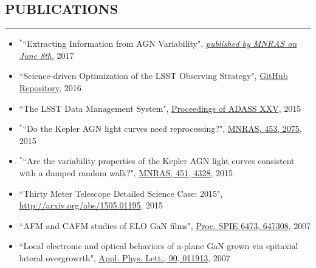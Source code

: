 \documentclass[10pt,a4]{article}
\newcounter{mySaveCounter}
\newcommand\myEnumReset{\setcounter{mySaveCounter}{0}}
\begin{document}
\subsection*{PUBLICATIONS}
\hrule  height 4pt
\vspace{0.2cm}
\begin{itemize}
	\item $\mathbf{^{*}}$``Extracting Information from AGN Variability", \href{https://doi.org/10.1093/mnras/stx1420}{\textit{published by MNRAS on June 8th}}, 2017
    \item ``Science-driven Optimization of the LSST Observing Strategy", \href{https://github.com/LSSTScienceCollaborations/ObservingStrategy}{GitHub Repository}, 2016
	\item ``The LSST Data Management System", \href{http://adsabs.harvard.edu/cgi-bin/bib_query?arXiv:1512.07914}{Proceedings of ADASS XXV}, 2015
	\item $\mathbf{^{*}}$``Do the Kepler AGN light curves need reprocessing?", \href{http://dx.doi.org/10.1093/mnras/stv1797}{MNRAS, 453, 2075}, 2015
	\item $\mathbf{^{*}}$``Are the variability properties of the Kepler AGN light curves consistent with a damped random walk?", \href{http://dx.doi.org/ 10.1093/mnras/stv1230}{MNRAS, 451, 4328}, 2015
	\item  ``Thirty Meter Telescope Detailed Science Case: 2015", \href{http://arxiv.org/abs/1505.01195}{http://arxiv.org/abs/1505.01195}, 2015
	\item  ``AFM and CAFM studies of ELO GaN films", \href{http://dx.doi.org/10.1117/12.706773}{Proc. SPIE 6473, 647308}, 2007
	\item ``Local electronic and optical behaviors of a-plane GaN grown via epitaxial lateral overgrowrth", \href{http://dx.doi.org/10.1063/1.2429901}{Appl. Phys. Lett., 90, 011913}, 2007
\end{itemize}
\myEnumReset
\end{document}
